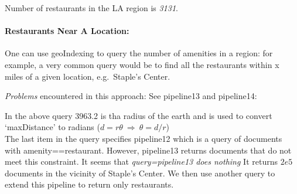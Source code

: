 \documentclass[]{article}
\newenvironment{Shaded}{\begin{snugshade}}{\end{snugshade}}
\newcommand{\DecValTok}[1]{\textcolor[rgb]{0.86,0.86,0.80}{{#1}}}
\newcommand{\FloatTok}[1]{\textcolor[rgb]{0.75,0.75,0.82}{{#1}}}
\newcommand{\StringTok}[1]{\textcolor[rgb]{0.80,0.58,0.58}{{#1}}}
\newcommand{\CommentTok}[1]{\textcolor[rgb]{0.50,0.62,0.50}{{#1}}}
\newcommand{\OtherTok}[1]{\textcolor[rgb]{0.94,0.94,0.56}{{#1}}}
\newcommand{\NormalTok}[1]{\textcolor[rgb]{0.80,0.80,0.80}{{#1}}}
\begin{document}
Number of restaurants in the LA region is \emph{3131}.

\paragraph{Restaurants Near A
Location:}\label{restaurants-near-a-location}

One can use geoIndexing to query the number of amenities in a region:
for example, a very common query would be to find all the restaurants
within x miles of a given location, e.g.~Staple's Center.

\emph{Problems} encountered in this approach: See pipeline13 and
pipeline14:

\begin{Shaded}
\end{Shaded}

In the above query 3963.2 is tha radius of the earth and is used to
convert `maxDistance' to radians
($d=r\theta \: \Rightarrow \: \theta=d/r$)\\The last item in the query
specifies pipeline12 which is a query of documents with
amenity==restaurant. However, pipeline13 returns documents that do not
meet this constraint. It seems that \emph{query=pipeline13 does nothing}
It returns $2e5$ documents in the vicinity of Staple's Center. We then
use another query to extend this pipeline to return only restaurants.
\end{document}
